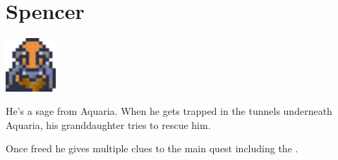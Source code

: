 \section{Spencer}
\label{char:spencer}

\includegraphics[height=2cm,keepaspectratio]{./resources/chars/spencer}

He’s a sage from Aquaria. When he gets trapped in the tunnels underneath Aquaria, his granddaughter  tries to rescue him.

Once freed he gives multiple clues to the main quest including the .
